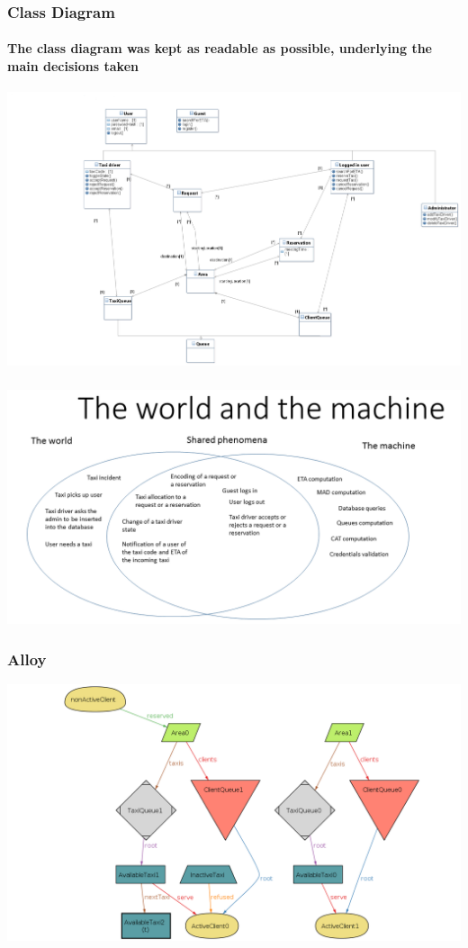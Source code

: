 \documentclass[10pt,xcolor={usenames,dvipsnames}]{beamer}
\begin{document}
\begin{frame}
	\frametitle{Class Diagram}
	\framesubtitle{The class diagram was kept as readable as possible, underlying the main decisions taken}
	\begin{center}
		\includegraphics[width=\textwidth,height=\textheight,keepaspectratio]{ClassDiagram}
	\end{center}
\end{frame}
\begin{frame}
	\frametitle{}
	\begin{center}
		\includegraphics[width=\textwidth,height=\textheight,keepaspectratio]{TWATM}
	\end{center}
\end{frame}
\begin{frame}
	\frametitle{Alloy}
	\begin{center}
		\includegraphics[width=\textwidth,height=\textheight,keepaspectratio]{reserved-and-refused}
	\end{center}
\end{frame}
\end{document}
